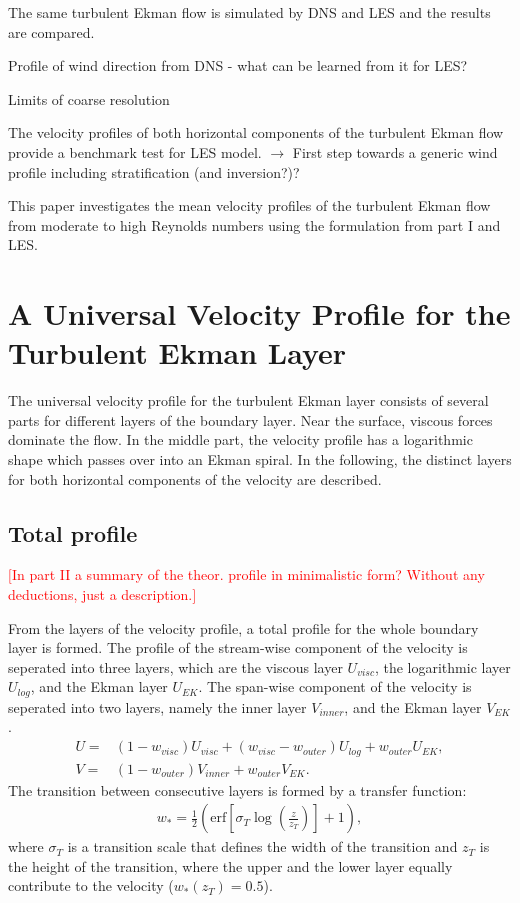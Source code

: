 \documentclass[a4paper,11pt]{article}
\newcommand{\todo}[1]{\textcolor{red}{$[$#1$]$}}
\begin{document}
The same turbulent Ekman flow is simulated by DNS and LES and the results are compared. 

Profile of wind direction from DNS - what can be learned from it for LES?

Limits of coarse resolution

The velocity profiles of both horizontal components of the turbulent Ekman flow provide a benchmark test for LES model. $\rightarrow$ First step towards a generic wind profile including stratification (and inversion?)?

This paper investigates the mean velocity profiles of the turbulent Ekman flow from moderate to high Reynolds numbers using the formulation from part I and LES.

\section{A Universal Velocity Profile for the Turbulent Ekman Layer}

The universal velocity profile for the turbulent Ekman layer consists of several parts for different layers of the boundary layer. Near the surface, viscous forces dominate the flow. In the middle part, the velocity profile has a logarithmic shape which passes over into an Ekman spiral. 
In the following, the distinct layers for both horizontal components of the velocity are described.

\subsection{Total profile}

\todo{In part II a summary of the theor. profile in minimalistic form? Without any deductions, just a description.} 

From the layers of the velocity profile, a total profile for the whole boundary layer is formed. The profile of the stream-wise component of the velocity is seperated into three layers, which are the viscous layer $U_{visc}$, the logarithmic layer $U_{log}$, and the Ekman layer $U_{EK}$. The span-wise component of the velocity is seperated into two layers, namely the inner layer $V_{inner}$, and the Ekman layer $V_{EK}$.
\begin{align}
  U =& (1-w_{visc})U_{visc} + (w_{visc}-w_{outer})U_{log} + w_{outer}U_{EK}, \\
	V =& (1-w_{outer})V_{inner} + w_{outer}V_{EK}.
\end{align}
The transition between consecutive layers is formed by a transfer function:
\begin{align}\label{error}
  w_{*} = \frac{1}{2}\left(\textrm{erf}\left[\sigma_T\log\left(\frac{z}{z_{T}}\right)\right]+1\right),
\end{align}
where $\sigma_T$ is a transition scale that defines the width of the transition and $z_{T}$ is the height of the transition, where the upper and the lower layer equally contribute to the velocity ($w_{*}(z_{T})=0.5$).
\end{document}
